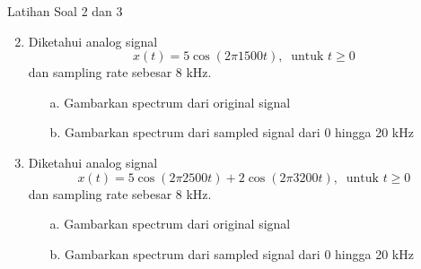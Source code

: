 \documentclass[pdflatex,compress,mathserif]{beamer}
\begin{document}
\begin{frame}{Latihan Soal 2 dan 3}
    \begin{enumerate}
        \setcounter{enumi}{1}
        \item Diketahui analog signal
        \begin{equation*}
            x(t) = 5 \cos (2 \pi 1500 t),~\text{ untuk } t \geq 0
        \end{equation*}
        dan sampling rate sebesar 8 kHz.
        \begin{enumerate}
            \item[a.] Gambarkan spectrum dari original signal
            \item[b.] Gambarkan spectrum dari sampled signal dari 0 hingga 20 kHz
        \end{enumerate}
    
        \item Diketahui analog signal
        \begin{equation*}
            x(t) = 5 \cos (2 \pi 2500 t) + 2 \cos (2 \pi 3200 t),~\text{ untuk } t \geq 0
        \end{equation*}
        dan sampling rate sebesar 8 kHz.
        \begin{enumerate}
            \item[a.] Gambarkan spectrum dari original signal
            \item[b.] Gambarkan spectrum dari sampled signal dari 0 hingga 20 kHz
        \end{enumerate}
    \end{enumerate}
\end{frame}
\end{document}
